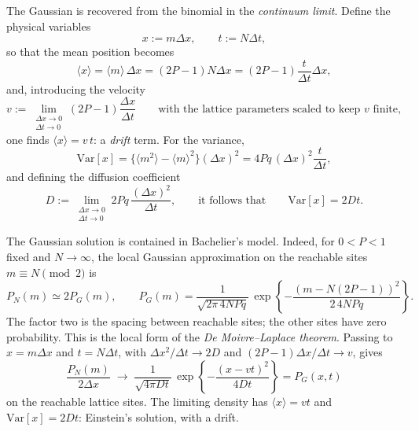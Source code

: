 The Gaussian is recovered from the binomial in the \emph{continuum limit}.
Define the physical variables
\begin{equation}
x:=m\Delta x, \qquad t:=N\Delta t,
\end{equation}
so that the mean position becomes
\begin{equation}
\langle x\rangle = \langle m\rangle\,\Delta x = (2P-1)N\Delta x = (2P-1)\frac{t}{\Delta t}\Delta x,
\end{equation}
and, introducing the velocity
\begin{equation}
v:=\lim_{\substack{\Delta x\to0\\ \Delta t\to0}} (2P-1)\frac{\Delta x}{\Delta t}
\qquad \text{with the lattice parameters scaled to keep $v$ finite},
\end{equation}
one finds $\langle x\rangle = v\,t$: a \emph{drift} term.
For the variance,
\begin{equation}
\mathrm{Var}[x] = \bigl\{\langle m^2\rangle - \langle m\rangle^2\bigr\}(\Delta x)^2 = 4Pq\,(\Delta x)^2\frac{t}{\Delta t},
\end{equation}
and defining the diffusion coefficient
\begin{equation}
D := \lim_{\substack{\Delta x\to0\\ \Delta t\to0}} 2Pq\,\frac{(\Delta x)^2}{\Delta t},
\qquad\text{it follows that}\qquad
\mathrm{Var}[x]=2Dt.
\end{equation}

The Gaussian solution is contained in Bachelier's model.
Indeed, for $0<P<1$ fixed and $N\to\infty$, the local Gaussian approximation on the reachable sites $m\equiv N\pmod 2$ is
\begin{equation}
P_N(m) \simeq 2P_G(m),\qquad
P_G(m)=\frac{1}{\sqrt{2\pi\,4NPq}}\,
\exp\!\left\{-\frac{(m-N(2P-1))^2}{2\,4NPq}\right\}.
\end{equation}
The factor two is the spacing between reachable sites; the other sites have zero probability.
This is the local form of the \emph{De Moivre--Laplace theorem}.
Passing to $x=m\Delta x$ and $t=N\Delta t$, with $\Delta x^2/\Delta t\to2D$ and $(2P-1)\Delta x/\Delta t\to v$, gives
\begin{equation}
\frac{P_N(m)}{2\Delta x}\;\longrightarrow\;
\frac{1}{\sqrt{4\pi Dt}}\,
\exp\!\left\{-\frac{(x-vt)^2}{4Dt}\right\}=P_G(x,t)
\end{equation}
on the reachable lattice sites.
The limiting density has $\langle x\rangle=vt$ and $\mathrm{Var}[x]=2Dt$: Einstein's solution, with a drift.

